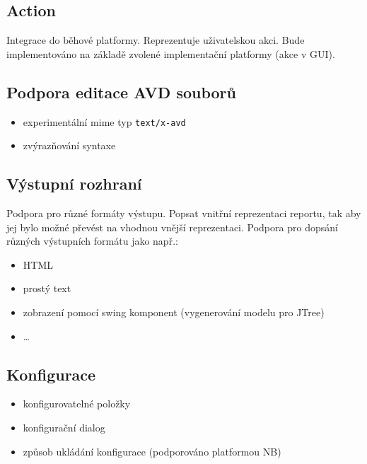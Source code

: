 \subsection{Action}
Integrace do běhové platformy. Reprezentuje uživatelskou akci. Bude implementováno na základě zvolené implementační platformy (akce v GUI).

\subsection{Podpora editace AVD souborů}
\begin{itemize}
\item experimentální mime typ \verb+text/x-avd+
\item zvýrazňování syntaxe
\end{itemize}

\subsection{Výstupní rozhraní}
Podpora pro různé formáty výstupu. Popsat vnitřní reprezentaci reportu, tak aby jej bylo možné převést na vhodnou vnější reprezentaci. Podpora pro dopsání různých výstupních formátu jako např.:
\begin{itemize}
\item HTML
\item prostý text
\item zobrazení pomocí swing komponent (vygenerování modelu pro JTree)
\item \ldots
\end{itemize}

\subsection{Konfigurace}
\begin{itemize}
\item konfigurovatelné položky
\item konfigurační dialog
\item způsob ukládání konfigurace (podporováno platformou NB)
\end{itemize}
